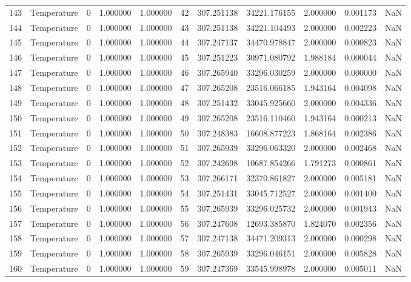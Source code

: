 \begin{tabular}{llrrrrrrrrr}
143 & Temperature & 0 & 1.000000 & 1.000000 & 42 & 307.251138 & 34221.176155 & 2.000000 & 0.001173 & NaN \\
144 & Temperature & 0 & 1.000000 & 1.000000 & 43 & 307.251138 & 34221.104493 & 2.000000 & 0.002223 & NaN \\
145 & Temperature & 0 & 1.000000 & 1.000000 & 44 & 307.247137 & 34470.978847 & 2.000000 & 0.000823 & NaN \\
146 & Temperature & 0 & 1.000000 & 1.000000 & 45 & 307.251223 & 30971.080792 & 1.988184 & 0.000044 & NaN \\
147 & Temperature & 0 & 1.000000 & 1.000000 & 46 & 307.265940 & 33296.030259 & 2.000000 & 0.000000 & NaN \\
148 & Temperature & 0 & 1.000000 & 1.000000 & 47 & 307.265208 & 23516.066185 & 1.943164 & 0.004098 & NaN \\
149 & Temperature & 0 & 1.000000 & 1.000000 & 48 & 307.251432 & 33045.925660 & 2.000000 & 0.004336 & NaN \\
150 & Temperature & 0 & 1.000000 & 1.000000 & 49 & 307.265208 & 23516.110460 & 1.943164 & 0.000213 & NaN \\
151 & Temperature & 0 & 1.000000 & 1.000000 & 50 & 307.248383 & 16608.877223 & 1.868164 & 0.002386 & NaN \\
152 & Temperature & 0 & 1.000000 & 1.000000 & 51 & 307.265939 & 33296.063320 & 2.000000 & 0.002468 & NaN \\
153 & Temperature & 0 & 1.000000 & 1.000000 & 52 & 307.242698 & 10687.854266 & 1.791273 & 0.000861 & NaN \\
154 & Temperature & 0 & 1.000000 & 1.000000 & 53 & 307.266171 & 32370.861827 & 2.000000 & 0.005181 & NaN \\
155 & Temperature & 0 & 1.000000 & 1.000000 & 54 & 307.251431 & 33045.712527 & 2.000000 & 0.001400 & NaN \\
156 & Temperature & 0 & 1.000000 & 1.000000 & 55 & 307.265939 & 33296.025732 & 2.000000 & 0.001943 & NaN \\
157 & Temperature & 0 & 1.000000 & 1.000000 & 56 & 307.247608 & 12693.385870 & 1.824070 & 0.002356 & NaN \\
158 & Temperature & 0 & 1.000000 & 1.000000 & 57 & 307.247138 & 34471.209313 & 2.000000 & 0.000298 & NaN \\
159 & Temperature & 0 & 1.000000 & 1.000000 & 58 & 307.265939 & 33296.046151 & 2.000000 & 0.005828 & NaN \\
160 & Temperature & 0 & 1.000000 & 1.000000 & 59 & 307.247369 & 33545.998978 & 2.000000 & 0.005011 & NaN \\

\end{tabular}
